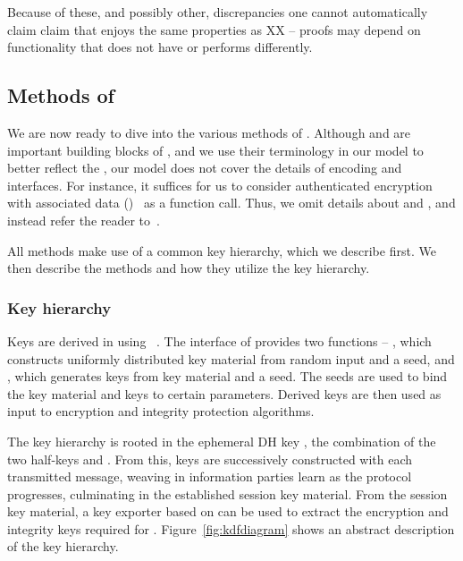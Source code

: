 Because of these, and possibly other, discrepancies one cannot automatically
claim claim that \mEdhoc{} enjoys
the same properties as XX -- proofs may depend on functionality that \mEdhoc{}
does not have or performs differently.
%

\spacehack
\subsection{Methods of \mEdhoc{}}
\label{sec:methods}
\fillhack
We are now ready to dive into the various methods of \mEdhoc. Although \mCose{} and \mCbor{} are important building blocks of \mEdhoc{}, and we use their terminology in our \mTamarin{} model to better reflect the \mSpec{}, our model does not cover the details of encoding and \mCose{} interfaces.
%
For instance, it suffices for us to consider authenticated encryption with associated data (\mAead{})~\cite{aead} as a function call. Thus, we omit details about \mCose{} and \mCbor{}, and instead refer the reader to~\cite{}. 
%

All methods make use of a common key hierarchy, which we describe first. We then describe the methods and how they utilize the key hierarchy.
%

\spacehack
\subsubsection{Key hierarchy}
\label{sec:keyHierarchy}

Keys are derived in \mEdhoc{} using \mHkdf{}~\cite{rfc5869}.
%
The interface of \mHkdf{} provides two functions -- \mHkdfExtract{}, which constructs uniformly distributed key material from random input and a seed, and \mHkdfExpand{}, which generates keys from key material and a seed.
%
The seeds are used to bind the key material and keys to certain parameters. Derived keys are then used as input to encryption and integrity protection algorithms.
%
%

The key hierarchy is rooted in the ephemeral DH key \mGxy{}, the combination of the two half-keys \mGx{} and \mGy{}.
%
From this, keys are successively constructed with each transmitted message, weaving in information parties learn as the protocol progresses, culminating in the established session key material.
%
From the session key material, a key exporter based on \mHkdf{} can be used to extract the encryption and integrity keys required for \mOscore{}.
%
Figure~\ref{fig:kdfdiagram} shows an abstract description of the key hierarchy.
%


